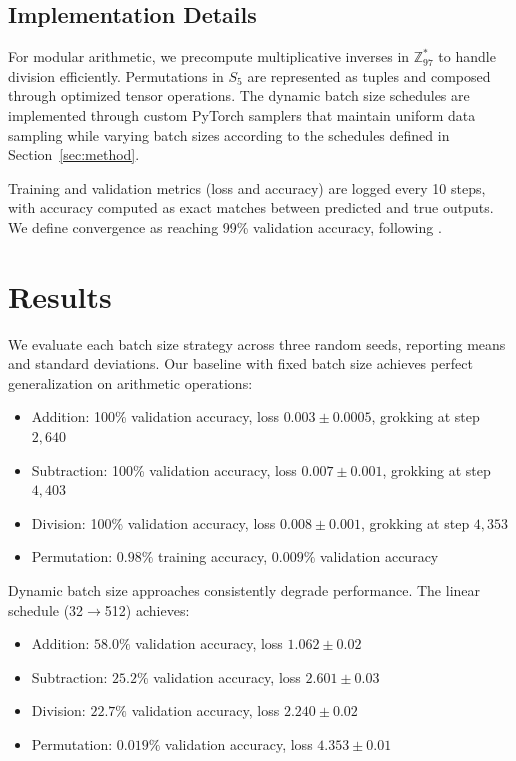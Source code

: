 \documentclass{article} %
\begin{document}
\subsection{Implementation Details}
For modular arithmetic, we precompute multiplicative inverses in $\mathbb{Z}_{97}^*$ to handle division efficiently. Permutations in $S_5$ are represented as tuples and composed through optimized tensor operations. The dynamic batch size schedules are implemented through custom PyTorch samplers that maintain uniform data sampling while varying batch sizes according to the schedules defined in Section~\ref{sec:method}.

Training and validation metrics (loss and accuracy) are logged every 10 steps, with accuracy computed as exact matches between predicted and true outputs. We define convergence as reaching 99\% validation accuracy, following \citet{power2022grokking}.

\section{Results}
\label{sec:results}

We evaluate each batch size strategy across three random seeds, reporting means and standard deviations. Our baseline with fixed batch size achieves perfect generalization on arithmetic operations:

\begin{itemize}
    \item Addition: 100\% validation accuracy, loss $0.003 \pm 0.0005$, grokking at step $2{,}640$
    \item Subtraction: 100\% validation accuracy, loss $0.007 \pm 0.001$, grokking at step $4{,}403$
    \item Division: 100\% validation accuracy, loss $0.008 \pm 0.001$, grokking at step $4{,}353$
    \item Permutation: $0.98\%$ training accuracy, $0.009\%$ validation accuracy
\end{itemize}

Dynamic batch size approaches consistently degrade performance. The linear schedule (32$\to$512) achieves:
\begin{itemize}
    \item Addition: $58.0\%$ validation accuracy, loss $1.062 \pm 0.02$
    \item Subtraction: $25.2\%$ validation accuracy, loss $2.601 \pm 0.03$
    \item Division: $22.7\%$ validation accuracy, loss $2.240 \pm 0.02$
    \item Permutation: $0.019\%$ validation accuracy, loss $4.353 \pm 0.01$
\end{itemize}
\end{document}
